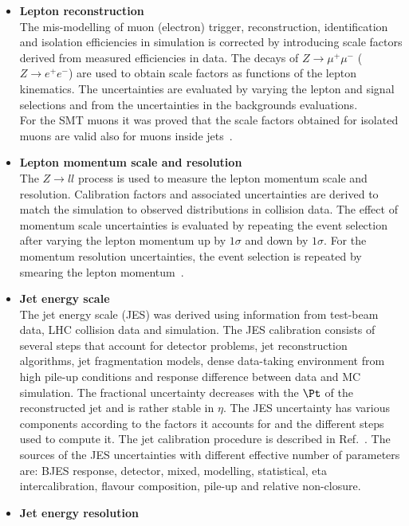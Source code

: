 \begin{itemize}
	\item \textbf{Lepton reconstruction} \\ 
	The mis-modelling of muon (electron) trigger, reconstruction,
	identification and isolation efficiencies in simulation is corrected by introducing
	scale factors derived from measured efficiencies in data. The decays
	of $Z \to \mu^+ \mu^-$ ($Z \to e^+ e^-$) are used to obtain scale
	factors as functions of the lepton kinematics. The uncertainties are
	evaluated by varying the lepton and signal selections and from the
	uncertainties in the backgrounds evaluations. \\
	For the SMT muons it was proved that the scale factors obtained for
	isolated muons are valid also for muons inside jets~\cite{SMT-INT-13TeV}. 
	\item \textbf{Lepton momentum scale and resolution} \\ 
	The $Z \to ll$ process is used to measure the lepton momentum scale
	and resolution. Calibration factors and associated uncertainties are
	derived to match the simulation to observed distributions in collision
	data. The effect of momentum scale uncertainties is evaluated by
	repeating the event selection after varying the lepton momentum up by
	$1\sigma$ and down by $1\sigma$. For the momentum resolution
	uncertainties, the event selection is repeated by smearing the lepton
	momentum~\cite{PERF-2013-05}.
	\item \textbf{Jet energy scale} \\ 
	The jet energy scale (JES) was derived using information from test-beam data, LHC
	collision data and simulation. The JES calibration consists of several
	steps that account for detector problems, jet reconstruction
	algorithms, jet fragmentation models, dense data-taking environment
	from high pile-up conditions and response difference between data and
	MC simulation. 
	The fractional uncertainty decreases with the $\Pt$ of the
	reconstructed jet and is rather stable in $\eta$. The JES uncertainty
	has various components according to the factors it accounts for and
	the different steps used to compute it. The jet calibration procedure
	is described in Ref.~\cite{PERF-2016-04}.
	The sources of the JES uncertainties with different effective number
	of parameters are: BJES response, detector, mixed, modelling,
	statistical, eta intercalibration, flavour composition, pile-up and
	relative non-closure. 
	\item \textbf{Jet energy resolution} \\ 

\end{itemize}
